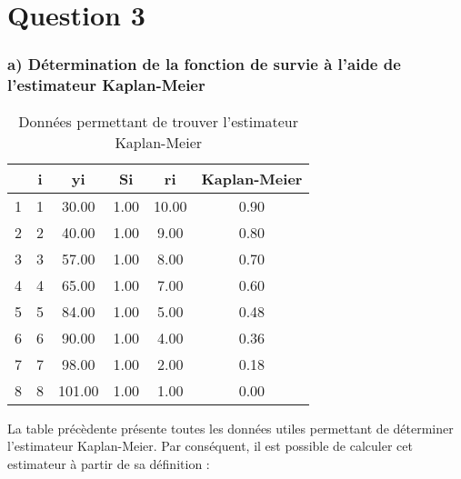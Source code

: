 \documentclass[]{article}
\begin{document}
\newpage

\section{Question 3}\label{question-3}

\subsubsection{a) Détermination de la fonction de survie à l'aide de
l'estimateur
Kaplan-Meier}\label{a-determination-de-la-fonction-de-survie-a-laide-de-lestimateur-kaplan-meier}

\begin{table}[ht]
\centering
\begin{tabular}{cccccc}
  \hline
 & i & yi & Si & ri & Kaplan-Meier \\ 
  \hline
1 &   1 & 30.00 & 1.00 & 10.00 & 0.90 \\ 
  2 &   2 & 40.00 & 1.00 & 9.00 & 0.80 \\ 
  3 &   3 & 57.00 & 1.00 & 8.00 & 0.70 \\ 
  4 &   4 & 65.00 & 1.00 & 7.00 & 0.60 \\ 
  5 &   5 & 84.00 & 1.00 & 5.00 & 0.48 \\ 
  6 &   6 & 90.00 & 1.00 & 4.00 & 0.36 \\ 
  7 &   7 & 98.00 & 1.00 & 2.00 & 0.18 \\ 
  8 &   8 & 101.00 & 1.00 & 1.00 & 0.00 \\ 
   \hline
\end{tabular}
\caption{Données permettant de trouver l'estimateur Kaplan-Meier} 
\end{table}

La table précèdente présente toutes les données utiles permettant de
déterminer l'estimateur Kaplan-Meier. Par conséquent, il est possible de
calculer cet estimateur à partir de sa définition :
\end{document}
